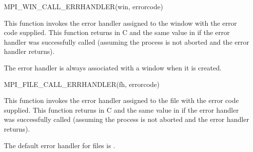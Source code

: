 \begin{funcdef}{MPI\_WIN\_CALL\_ERRHANDLER}{(\mbox{win}, \mbox{errorcode})}
\end{funcdef}

This function invokes the error handler assigned to the window
with the error code supplied.  
This function returns  in C and the same
value in  if the error handler was successfully called
(assuming the process is not aborted and the error handler returns).

\begin{users}
The error handler  is always associated with a
window when it is created.
\end{users}

\begin{funcdef}{MPI\_FILE\_CALL\_ERRHANDLER}{(\mbox{fh}, \mbox{errorcode})}
\end{funcdef}

This function invokes the error handler assigned to the file
with the error code supplied.  
This function returns  in C and the same
value in  if the error handler was successfully called
(assuming the process is not aborted and the error handler returns).

\begin{users}
The default error handler for files is
.
\end{users}

